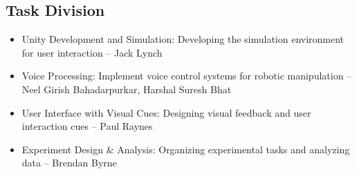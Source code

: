 \documentclass[conference]{IEEEtran}
\begin{document}
\subsection{Task Division}
\begin{itemize}
\item Unity Development and Simulation: Developing the simulation environment for user interaction – Jack Lynch 
\item Voice Processing: Implement voice control systems for robotic manipulation – Neel Girish Bahadarpurkar, Harshal Suresh Bhat 
\item User Interface with Visual Cues: Designing visual feedback and user interaction cues – Paul Raynes 
\item Experiment Design \& Analysis: Organizing experimental tasks and analyzing data – Brendan Byrne 
\end{itemize}



\end{document}
